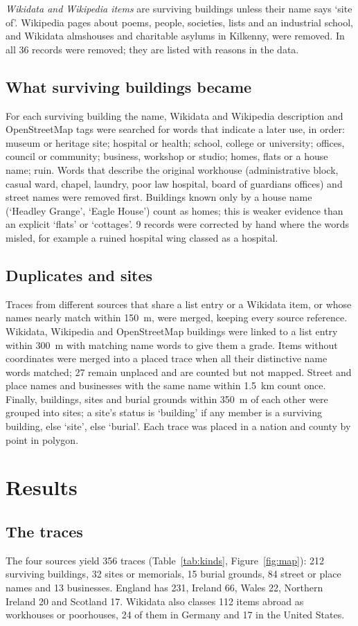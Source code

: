 \documentclass[11pt,a4paper]{article}
\begin{document}
\textit{Wikidata and Wikipedia items} are surviving buildings unless their name says `site of'. Wikipedia pages about poems, people, societies, lists and an industrial school, and Wikidata almshouses and charitable asylums in Kilkenny, were removed. In all 36 records were removed; they are listed with reasons in the data.

\subsection{What surviving buildings became}
For each surviving building the name, Wikidata and Wikipedia description and OpenStreetMap tags were searched for words that indicate a later use, in order: museum or heritage site; hospital or health; school, college or university; offices, council or community; business, workshop or studio; homes, flats or a house name; ruin. Words that describe the original workhouse (administrative block, casual ward, chapel, laundry, poor law hospital, board of guardians offices) and street names were removed first. Buildings known only by a house name (`Headley Grange', `Eagle House') count as homes; this is weaker evidence than an explicit `flats' or `cottages'. 9 records were corrected by hand where the words misled, for example a ruined hospital wing classed as a hospital.

\subsection{Duplicates and sites}
Traces from different sources that share a list entry or a Wikidata item, or whose names nearly match within 150~m, were merged, keeping every source reference. Wikidata, Wikipedia and OpenStreetMap buildings were linked to a list entry within 300~m with matching name words to give them a grade. Items without coordinates were merged into a placed trace when all their distinctive name words matched; 27 remain unplaced and are counted but not mapped. Street and place names and businesses with the same name within 1.5~km count once. Finally, buildings, sites and burial grounds within 350~m of each other were grouped into sites; a site's status is `building' if any member is a surviving building, else `site', else `burial'. Each trace was placed in a nation and county by point in polygon.

\section{Results}
\subsection{The traces}
The four sources yield 356 traces (Table~\ref{tab:kinds}, Figure~\ref{fig:map}): 212 surviving buildings, 32 sites or memorials, 15 burial grounds, 84 street or place names and 13 businesses. England has 231, Ireland 66, Wales 22, Northern Ireland 20 and Scotland 17. Wikidata also classes 112 items abroad as workhouses or poorhouses, 24 of them in Germany and 17 in the United States.
\end{document}
